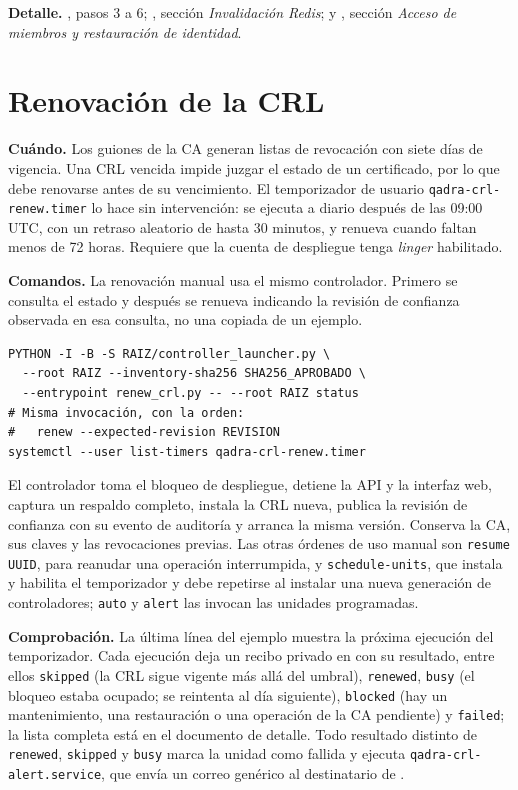 \textbf{Detalle.} , pasos 3 a 6;
, sección
\emph{Invalidación Redis}; y , sección
\emph{Acceso de miembros y restauración de identidad}.

\section{Renovación de la CRL}\label{sec:op-crl}

\textbf{Cuándo.} Los guiones de la CA generan listas de revocación con siete
días de vigencia. Una CRL vencida impide juzgar el estado de un certificado,
por lo que debe renovarse antes de su vencimiento. El temporizador de usuario
\texttt{qadra-crl-renew.timer} lo hace sin intervención: se ejecuta a diario
después de las 09:00 UTC, con un retraso aleatorio de hasta 30 minutos, y
renueva cuando faltan menos de 72 horas. Requiere que la cuenta de despliegue
tenga \emph{linger} habilitado.

\textbf{Comandos.} La renovación manual usa el mismo controlador. Primero se
consulta el estado y después se renueva indicando la revisión de confianza
observada en esa consulta, no una copiada de un ejemplo.

\begin{verbatim}
PYTHON -I -B -S RAIZ/controller_launcher.py \
  --root RAIZ --inventory-sha256 SHA256_APROBADO \
  --entrypoint renew_crl.py -- --root RAIZ status
# Misma invocación, con la orden:
#   renew --expected-revision REVISION
systemctl --user list-timers qadra-crl-renew.timer
\end{verbatim}

El controlador toma el bloqueo de despliegue, detiene la API y la interfaz
web, captura un respaldo completo, instala la CRL nueva, publica la revisión
de confianza con su evento de auditoría y arranca la misma versión. Conserva
la CA, sus claves y las revocaciones previas. Las otras órdenes de uso manual
son \texttt{resume UUID}, para reanudar una operación interrumpida, y
\texttt{schedule-units}, que instala y habilita el temporizador y debe
repetirse al instalar una nueva generación de controladores; \texttt{auto} y
\texttt{alert} las invocan las unidades programadas.

\textbf{Comprobación.} La última línea del ejemplo muestra la próxima
ejecución del temporizador. Cada ejecución deja un recibo privado en
\archivo{maintenance/crl-schedule/} con su resultado, entre ellos
\texttt{skipped} (la CRL sigue vigente más allá del umbral), \texttt{renewed}, \texttt{busy} (el bloqueo estaba
ocupado; se reintenta al día siguiente), \texttt{blocked} (hay un
mantenimiento, una restauración o una operación de la CA pendiente) y
\texttt{failed}; la lista completa está en el documento de detalle. Todo
resultado distinto de \texttt{renewed}, \texttt{skipped} y \texttt{busy}
marca la unidad como fallida y ejecuta \texttt{qadra-crl-alert.service}, que
envía un correo genérico al destinatario de
\archivo{config/crl-schedule.json}.

